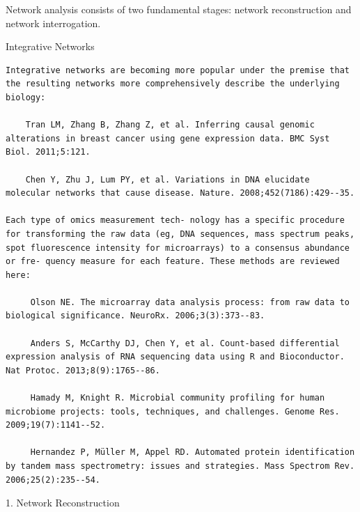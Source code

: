 \documentclass[
]{book}
\begin{document}
Network analysis consists of two fundamental stages: network reconstruction and network interrogation.

Integrative Networks

\begin{verbatim}
Integrative networks are becoming more popular under the premise that the resulting networks more comprehensively describe the underlying biology:

    Tran LM, Zhang B, Zhang Z, et al. Inferring causal genomic alterations in breast cancer using gene expression data. BMC Syst Biol. 2011;5:121.

    Chen Y, Zhu J, Lum PY, et al. Variations in DNA elucidate molecular networks that cause disease. Nature. 2008;452(7186):429--35.

Each type of omics measurement tech- nology has a specific procedure for transforming the raw data (eg, DNA sequences, mass spectrum peaks, spot fluorescence intensity for microarrays) to a consensus abundance or fre- quency measure for each feature. These methods are reviewed here:

     Olson NE. The microarray data analysis process: from raw data to biological significance. NeuroRx. 2006;3(3):373--83.

     Anders S, McCarthy DJ, Chen Y, et al. Count-based differential expression analysis of RNA sequencing data using R and Bioconductor. Nat Protoc. 2013;8(9):1765--86.

     Hamady M, Knight R. Microbial community profiling for human microbiome projects: tools, techniques, and challenges. Genome Res. 2009;19(7):1141--52.

     Hernandez P, Müller M, Appel RD. Automated protein identification by tandem mass spectrometry: issues and strategies. Mass Spectrom Rev. 2006;25(2):235--54.
\end{verbatim}

1. Network Reconstruction
\end{document}
